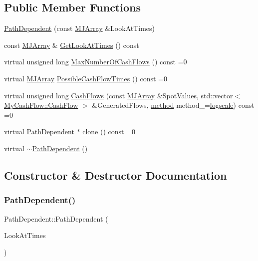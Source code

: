 \subsection*{Public Member Functions}
\begin{DoxyCompactItemize}
\item 
\hyperlink{classPathDependent_a8cfc72efb5b9db14bc3937eea79a541c}{Path\+Dependent} (const \hyperlink{classMJArray}{M\+J\+Array} \&Look\+At\+Times)
\item 
const \hyperlink{classMJArray}{M\+J\+Array} \& \hyperlink{classPathDependent_a8d02dbaa57013eab27c857b6f66d64ef}{Get\+Look\+At\+Times} () const
\item 
virtual unsigned long \hyperlink{classPathDependent_a1ee091a4f3680339683af087dfb4ca0f}{Max\+Number\+Of\+Cash\+Flows} () const =0
\item 
virtual \hyperlink{classMJArray}{M\+J\+Array} \hyperlink{classPathDependent_a4c8bf82be7f4443c5c8177d7500d542d}{Possible\+Cash\+Flow\+Times} () const =0
\item 
virtual unsigned long \hyperlink{classPathDependent_a5d5b1d6ecf9dc6be128fff9694f589c8}{Cash\+Flows} (const \hyperlink{classMJArray}{M\+J\+Array} \&Spot\+Values, std\+::vector$<$ \hyperlink{classMyCashFlow_1_1CashFlow}{My\+Cash\+Flow\+::\+Cash\+Flow} $>$ \&Generated\+Flows, \hyperlink{PathDependent_8h_abed946c62f140eb7ff2ac742e6ad9497}{method} method\+\_\+=\hyperlink{PathDependent_8h_abed946c62f140eb7ff2ac742e6ad9497a064d3d3358889658ce07fe9f3191d1fd}{logscale}) const =0
\item 
virtual \hyperlink{classPathDependent}{Path\+Dependent} $\ast$ \hyperlink{classPathDependent_afcc10647f591175642c6dc0adba23f0b}{clone} () const =0
\item 
virtual \hyperlink{classPathDependent_af508f6b23ecba8fcf7d4a1dd90a7a7f8}{$\sim$\+Path\+Dependent} ()
\end{DoxyCompactItemize}


\subsection{Constructor \& Destructor Documentation}
\hypertarget{classPathDependent_a8cfc72efb5b9db14bc3937eea79a541c}{}\label{classPathDependent_a8cfc72efb5b9db14bc3937eea79a541c} 
\subsubsection{\texorpdfstring{Path\+Dependent()}{PathDependent()}}
{\footnotesize\ttfamily Path\+Dependent\+::\+Path\+Dependent (\begin{DoxyParamCaption}\item[{const \hyperlink{classMJArray}{M\+J\+Array} \&}]{Look\+At\+Times }\end{DoxyParamCaption})}

